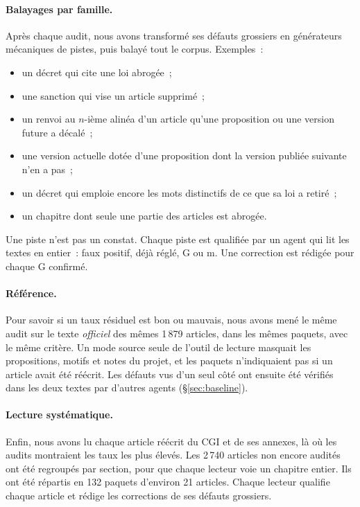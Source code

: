 \documentclass[11pt,a4paper]{article}
\begin{document}
\paragraph{Balayages par famille.}
Après chaque audit, nous avons transformé ses défauts grossiers en générateurs mécaniques de pistes, puis balayé tout le corpus. Exemples~:
\begin{itemize}
  \item un décret qui cite une loi abrogée~;
  \item une sanction qui vise un article supprimé~;
  \item un renvoi au $n$-ième alinéa d'un article qu'une proposition ou une version future a décalé~;
  \item une version actuelle dotée d'une proposition dont la version publiée suivante n'en a pas~;
  \item un décret qui emploie encore les mots distinctifs de ce que sa loi a retiré~;
  \item un chapitre dont seule une partie des articles est abrogée.
\end{itemize}
Une piste n'est pas un constat. Chaque piste est qualifiée par un agent qui lit les textes en entier~: faux positif, déjà réglé, G ou m. Une correction est rédigée pour chaque G confirmé.

\paragraph{Référence.}
Pour savoir si un taux résiduel est bon ou mauvais, nous avons mené le même audit sur le texte \emph{officiel} des mêmes 1\,879 articles, dans les mêmes paquets, avec le même critère. Un mode \og source seule \fg{} de l'outil de lecture masquait les propositions, motifs et notes du projet, et les paquets n'indiquaient pas si un article avait été réécrit. Les défauts vus d'un seul côté ont ensuite été vérifiés dans les deux textes par d'autres agents (\S\ref{sec:baseline}).

\paragraph{Lecture systématique.}
Enfin, nous avons lu chaque article réécrit du CGI et de ses annexes, là où les audits montraient les taux les plus élevés. Les 2\,740 articles non encore audités ont été regroupés par section, pour que chaque lecteur voie un chapitre entier. Ils ont été répartis en 132 paquets d'environ 21 articles. Chaque lecteur qualifie chaque article et rédige les corrections de ses défauts grossiers.
\end{document}
